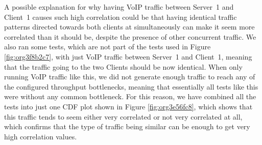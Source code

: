 \documentclass[a4paper,11pt]{article}
\begin{document}
A possible explanation for why having VoIP traffic between Server~1 and Client~1 causes such high correlation could be that having identical traffic patterns directed towards both clients at simultaneously can make it seem more correlated than it should be, despite the presence of other concurrent traffic. We also ran some tests, which are not part of the tests used in Figure \ref{fig:org3f8b2c7}, with just VoIP traffic between Server~1 and Client~1, meaning that the traffic going to the two Clients should be now identical. When only running VoIP traffic like this, we did not generate enough traffic to reach any of the configured throughput bottlenecks, meaning that essentially all tests like this were without any common bottleneck. For this reason, we have combined all the tests into just one CDF plot shown in Figure \ref{fig:org3e56fc8}, which shows that this traffic tends to seem either very correlated or not very correlated at all, which confirms that the type of traffic being similar can be enough to get very high correlation values.
\end{document}
